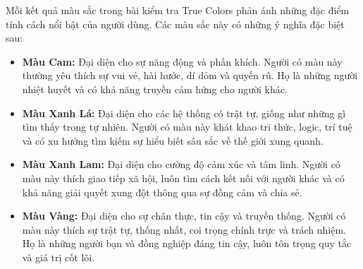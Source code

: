 Mỗi kết quả màu sắc trong bài kiểm tra True Colors phản ánh những đặc điểm tính cách nổi bật của người dùng. Các màu sắc này có những ý nghĩa đặc biệt sau:

\begin{itemize}
    \item \textbf{Màu Cam:} Đại diện cho sự năng động và phấn khích. Người có màu này thường yêu thích sự vui vẻ, hài hước, dí dỏm và quyến rũ. Họ là những người nhiệt huyết và có khả năng truyền cảm hứng cho người khác.
    \item \textbf{Màu Xanh Lá:} Đại diện cho các hệ thống có trật tự, giống như những gì tìm thấy trong tự nhiên. Người có màu này khát khao tri thức, logic, trí tuệ và có xu hướng tìm kiếm sự hiểu biết sâu sắc về thế giới xung quanh.
    \item \textbf{Màu Xanh Lam:} Đại diện cho cường độ cảm xúc và tâm linh. Người có màu này thích giao tiếp xã hội, luôn tìm cách kết nối với người khác và có khả năng giải quyết xung đột thông qua sự đồng cảm và chia sẻ.
    \item \textbf{Màu Vàng:} Đại diện cho sự chân thực, tin cậy và truyền thống. Người có màu này thích sự trật tự, thống nhất, coi trọng chính trực và trách nhiệm. Họ là những người bạn và đồng nghiệp đáng tin cậy, luôn tôn trọng quy tắc và giá trị cốt lõi.
\end{itemize}

